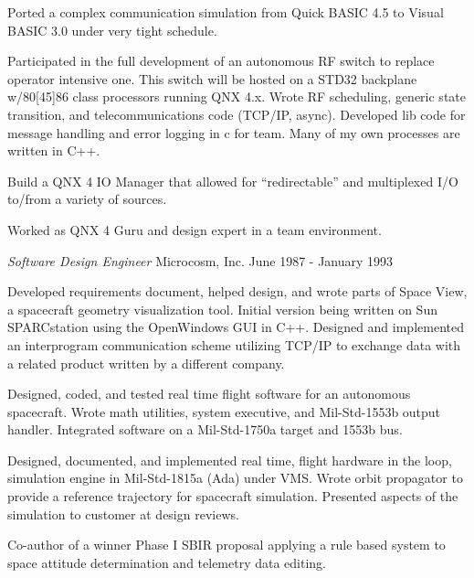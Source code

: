 \documentclass[margin]{res}
\begin{document}
\begin{resume}
                Ported a complex communication simulation from Quick
                BASIC 4.5 to Visual BASIC 3.0 under very tight schedule.

                Participated in the full development of an autonomous RF
                switch to replace operator intensive one. This switch
                will be hosted on a STD32 backplane w/80[45]86 class
                processors running QNX 4.x. Wrote RF scheduling, generic
                state transition, and telecommunications code (TCP/IP,
                async). Developed lib code for message handling and
                error logging in c for team. Many of my own processes
                are written in C++.

                Build a QNX 4 IO Manager that allowed for
                “redirectable” and multiplexed I/O to/from a variety
                of sources.

                Worked as QNX 4 Guru and design expert in a team
                environment.

                {\sl\large Software Design Engineer } Microcosm, Inc. \hfill June 1987 - January 1993

                Developed requirements document, helped design, and wrote
                parts of Space View, a spacecraft geometry visualization
                tool. Initial version being written on Sun SPARCstation
                using the OpenWindows GUI in C++. Designed and implemented
                an interprogram communication scheme utilizing TCP/IP
                to exchange data with a related product written by a
                different company.

                Designed, coded, and tested real time flight software for
                an autonomous spacecraft. Wrote math utilities, system
                executive, and Mil-Std-1553b output handler. Integrated
                software on a Mil-Std-1750a target and 1553b bus.

                Designed, documented, and implemented real time, flight
                hardware in the loop, simulation engine in Mil-Std-1815a
                (Ada) under VMS. Wrote orbit propagator to provide a
                reference trajectory for spacecraft simulation. Presented
                aspects of the simulation to customer at design reviews.

                Co-author of a winner Phase I SBIR proposal applying a
                rule based system to space attitude determination and
                telemetry data editing.


\end{resume}
\end{document}
